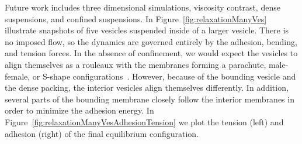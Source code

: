 \documentclass[prf,superscriptaddress,showpacs]{revtex4-1}
\begin{document}
Future work includes three dimensional simulations, viscosity contrast,
dense suspensions, and confined suspensions.  In
Figure~\ref{fig:relaxationManyVes} illustrate snapshots of five vesicles
suspended inside of a larger vesicle.  There is no imposed flow, so the
dynamics are governed entirely by the adhesion, bending, and tension
forces.  In the absence of confinement, we would expect the vesicles to
align themselves as a rouleaux with the membranes forming a parachute,
male-female, or S-shape
configurations~\cite{FlormannAouane2017_SciReports}.  However, because
of the bounding vesicle and the dense packing, the interior vesicles
align themselves differently.  In addition, several parts of the
bounding membrane closely follow the interior membranes in order to
minimize the adhesion energy.  In
Figure~\ref{fig:relaxationManyVesAdhesionTension} we plot the tension
(left) and adhesion (right) of the final equilibrium configuration.
\end{document}
